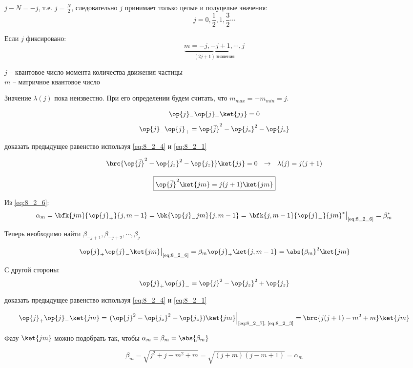 $j - N = -j$, т.е. $j = \frac{N}{2}$, следовательно $j$ принимает только целые и полуцелые значения:
$$
j = 0, \frac{1}{2}, 1, \frac{3}{2} \cdots
$$

Если $j$ фиксировано:
$$
\underbrace{m = -j, -j + 1, \cdots, j}_{(2j + 1)~\text{значения}}
$$

\noindent
$j$ -- квантовое число момента количества движения частицы\\
$m$ -- матричное квантовое число

Значение $\lambda(j)$ пока неизвестно. При его определении будем считать, что $m_{max} = -m_{min} = j$.

$$
\op{j}_{-} \op{j}_{+} \ket{jj} = 0
$$
$$
\op{j}_{-} \op{j}_{+} = \op{\vec{j}}^2 - \op{j_z}^2 - \op{j_z}
$$
\begin{excr}
доказать предыдущее равенство используя \eqref{eq:8_2_4} и \eqref{eq:8_2_1}
\end{excr}

$$
\brc{\op{\vec{j}}^2 - \op{j_z}^2 - \op{j_z}} \ket{jj} = 0 ~~\rightarrow~~ \lambda(j) = j(j+1)
$$

\begin{equation}
\label{eq:8_2_7}
\boxed {
	\op{\vec{j}}^2 \ket{jm} = j(j+1) \ket{jm}
}
\end{equation}

Из \eqref{eq:8_2_6}:
$$
\alpha_m = \bfk{jm}{\op{j}_{+}}{j, m-1} = \bk{\op{j}_{-}jm}{j, m-1} = \left. \bfk{j,m-1}{\op{j}_{-}}{jm}^* \right|_{\text{\eqref{eq:8_2_6}}} = \beta_m^*
$$

Теперь необходимо найти $\beta_{-j+1}, \beta_{-j+2}, \cdots, \beta_{j}$

$$
\left. \op{j}_{+} \op{j}_{-} \ket{jm} \right|_{\text{\eqref{eq:8_2_6}}} = \beta_m \op{j}_{+} \ket{j, m-1} = \abs{\beta_m}^2 \ket{jm}
$$

С другой стороны:
$$
\op{j}_{+} \op{j}_{-} = \op{j}^2 - \op{j_z}^2 + \op{j_z}
$$

\begin{excr}
доказать предыдущее равенство используя \eqref{eq:8_2_4} и \eqref{eq:8_2_1}
\end{excr}

$$
\op{j}_{+} \op{j}_{-} \ket{jm} = \left. (\op{j}^2 - \op{j_z}^2 + \op{j_z}) \ket{jm} \right|_{\text{\eqref{eq:8_2_7}, \eqref{eq:8_2_3}}} = \brc{j(j+1) - m^2 + m} \ket{jm}
$$

Фазу $\ket{jm}$ можно подобрать так, чтобы $\alpha_m = \beta_m  = \abs{\beta_m}$

$$
\beta_m = \sqrt{j^2 + j - m^2 + m} = \sqrt{(j+m)(j-m+1)} = \alpha_m
$$

